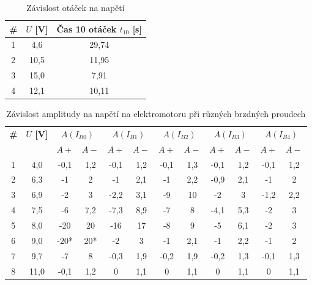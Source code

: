 \documentclass[a4paper,12pt]{article}
\begin{document}
\begin{table}[H]
    \centering
    \renewcommand{\arraystretch}{1.5}
    \begin{tabular}{|c|c|c|}
        \hline
        \textbf{\#} & \textbf{$U$ [V]} & \textbf{Čas 10 otáček $t_{10}$ [s]} \\ \hline
        1 & 4,6 & 29,74 \\ \hline
        2 & 10,5 & 11,95 \\ \hline
        3 & 15,0 & 7,91 \\ \hline
        4 & 12,1 & 10,11 \\ \hline
    \end{tabular}
    \caption{Závislost otáček na napětí}
    \label{tab:frekvence}
\end{table}

\begin{table}[H]
    \centering
    \renewcommand{\arraystretch}{1.5}
    \begin{tabular}{|c|c||c|c||c|c||c|c||c|c||c|c|}
        \hline
        \textbf{\#} & \textbf{$U$ [V]} 
        & \multicolumn{2}{c||}{$A(I_{B0})$} 
        & \multicolumn{2}{c||}{$A(I_{B1})$} 
        & \multicolumn{2}{c||}{$A(I_{B2})$} 
        & \multicolumn{2}{c||}{$A(I_{B3})$} 
        & \multicolumn{2}{c|}{$A(I_{B4})$} \\
        & & $A+$ & $A-$ & $A+$ & $A-$ & $A+$ & $A-$ & $A+$ & $A-$ & $A+$ & $A-$ \\ \hline
        1 & 4,0 & -0,1 & 1,2 & -0,1 & 1,2 & -0,1 & 1,3 & -0,1 & 1,2 & -0,1 &  1,2 \\ \hline
        2 & 6,3 & -1 & 2 & -1 & 2,1 & -1 & 2,2 & -0,9 & 2,1 & -1 & 2 \\ \hline
        3 & 6,9 & -2 & 3 & -2,2 & 3,1 & -9 & 10 & -2 & 3 & -1,2 & 2,2 \\ \hline
        4 & 7,5 & -6 & 7,2 & -7,3 & 8,9 & -7 & 8 & -4,1 & 5,3 & -2 & 3 \\ \hline
        5 & 8,0 & -20 & 20 & -16 & 17 & -8 & 9 & -5 & 6,1 & -2 & 3 \\ \hline
        6 & 9,0 & -20* & 20* & -2 & 3 & -1 & 2,1 & -1 & 2,2 & -1 & 2 \\ \hline
        7 & 9,7 & -7 & 8 & -0,3 & 1,9 & -0,2 & 1,9 & -0,2 & 1,3 & -0,1 & 1,3 \\ \hline
        8 & 11,0 & -0,1 & 1,2 & 0 & 1,1 & 0 & 1,1 & 0 & 1,1 & 0 & 1,1 \\ \hline
    \end{tabular}
    \caption{Závislost amplitudy na napětí na elektromotoru při různých brzdných proudech}
    \label{tab:amplituda}
\end{table}
\end{document}

